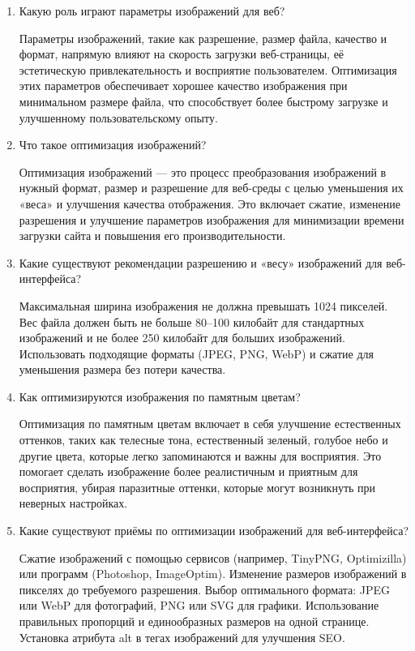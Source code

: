 \begin{enumerate}
    \item Какую роль играют параметры изображений для веб?

    Параметры изображений, такие как разрешение, размер файла, качество и формат, напрямую влияют на скорость загрузки веб-страницы, её эстетическую привлекательность и восприятие пользователем. Оптимизация этих параметров обеспечивает хорошее качество изображения при минимальном размере файла, что способствует более быстрому загрузке и улучшенному пользовательскому опыту.

    \item Что такое оптимизация изображений?

        Оптимизация изображений — это процесс преобразования изображений в нужный формат, размер и разрешение для веб-среды с целью уменьшения их «веса» и улучшения качества отображения. Это включает сжатие, изменение разрешения и улучшение параметров изображения для минимизации времени загрузки сайта и повышения его производительности.

    \item Какие существуют рекомендации разрешению и «весу» изображений для веб-интерфейса?

    Максимальная ширина изображения не должна превышать 1024 пикселей.
    Вес файла должен быть не больше 80–100 килобайт для стандартных изображений и не более 250 килобайт для больших изображений.
    Использовать подходящие форматы (JPEG, PNG, WebP) и сжатие для уменьшения размера без потери качества.

    \item Как оптимизируются изображения по памятным цветам?

        Оптимизация по памятным цветам включает в себя улучшение естественных оттенков, таких как телесные тона, естественный зеленый, голубое небо и другие цвета, которые легко запоминаются и важны для восприятия. Это помогает сделать изображение более реалистичным и приятным для восприятия, убирая паразитные оттенки, которые могут возникнуть при неверных настройках.

    \item Какие существуют приёмы по оптимизации изображений для веб-интерфейса?

    Сжатие изображений с помощью сервисов (например, TinyPNG, Optimizilla) или программ (Photoshop, ImageOptim).
    Изменение размеров изображений в пикселях до требуемого разрешения.
    Выбор оптимального формата: JPEG или WebP для фотографий, PNG или SVG для графики.
    Использование правильных пропорций и единообразных размеров на одной странице.
    Установка атрибута alt в тегах изображений для улучшения SEO.
\end{enumerate}


